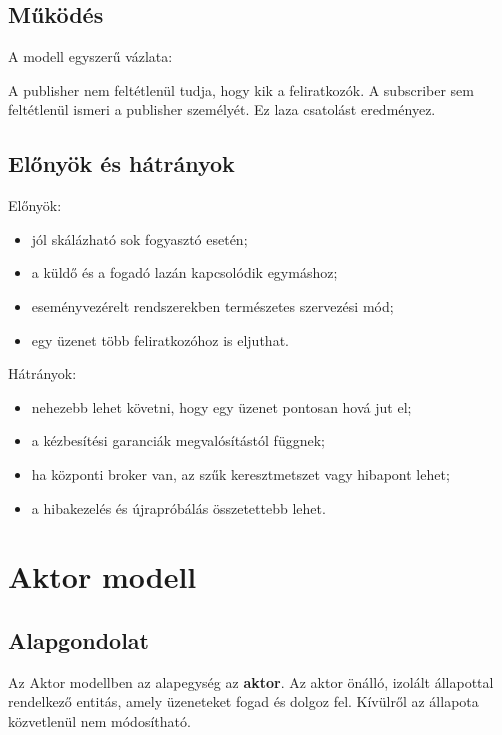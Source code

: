 \subsection{Működés}

A modell egyszerű vázlata:


A publisher nem feltétlenül tudja, hogy kik a feliratkozók. A subscriber sem feltétlenül ismeri a publisher személyét. Ez laza csatolást eredményez.

\subsection{Előnyök és hátrányok}

Előnyök:

\begin{itemize}
  \item jól skálázható sok fogyasztó esetén;
  \item a küldő és a fogadó lazán kapcsolódik egymáshoz;
  \item eseményvezérelt rendszerekben természetes szervezési mód;
  \item egy üzenet több feliratkozóhoz is eljuthat.
\end{itemize}

Hátrányok:

\begin{itemize}
  \item nehezebb lehet követni, hogy egy üzenet pontosan hová jut el;
  \item a kézbesítési garanciák megvalósítástól függnek;
  \item ha központi broker van, az szűk keresztmetszet vagy hibapont lehet;
  \item a hibakezelés és újrapróbálás összetettebb lehet.
\end{itemize}

\section{Aktor modell}

\subsection{Alapgondolat}

Az Aktor modellben az alapegység az \textbf{aktor}. Az aktor önálló, izolált állapottal rendelkező entitás, amely üzeneteket fogad és dolgoz fel. Kívülről az állapota közvetlenül nem módosítható.

